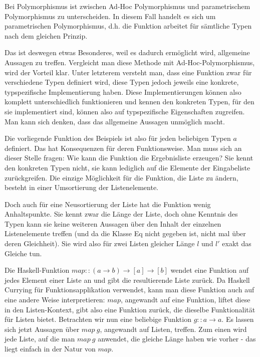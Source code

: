 Bei Polymorphismus ist zwischen Ad-Hoc Polymorphismus und parametrischem Poly\-mor\-phis\-mus zu unterscheiden. In diesem Fall handelt es sich um parametrischen Polymorphismus, d.h. die Funktion arbeitet für sämtliche Typen nach dem gleichen Prinzip.

Das ist deswegen etwas Besonderes, weil es dadurch ermöglicht wird, allgemeine Aussagen zu treffen. Vergleicht man diese
Methode mit Ad-Hoc-Polymorphismus, wird der Vorteil klar. Unter letzterem versteht man, dass eine Funktion zwar für verschiedene Typen definiert wird, diese Typen jedoch jeweils eine konkrete, typspezifische Implementierung haben. Diese
Implementierungen können also komplett unterschiedlich funktionieren und kennen den konkreten Typen, für den sie implementiert
sind, können also auf typspezifische Eigenschaften zugreifen. Man kann sich denken, dass das allgemeine Aussagen unmöglich
macht.

Die vorliegende Funktion des Beispiels ist also für jeden beliebigen Typen $a$ definiert. Das hat Konsequenzen für
deren Funktionsweise. Man muss sich an dieser Stelle fragen: Wie kann die Funktion die Ergebnisliste erzeugen? Sie kennt den konkreten Typen nicht, sie kann lediglich auf die Elemente der Eingabeliste zurückgreifen. Die einzige Möglichkeit für die Funktion,
die Liste zu ändern, besteht in einer Umsortierung der Listenelemente.

Doch auch für eine Neusortierung der Liste hat die Funktion wenig Anhaltspunkte. Sie kennt zwar die Länge der Liste, doch ohne Kenntnis des Typen kann sie keine weiteren Aussagen über den Inhalt der einzelnen Listenelemente treffen (und da die Klasse Eq nicht
gegeben ist, nicht mal über deren Gleichheit). Sie wird also für zwei Listen gleicher Länge $l$ und $l'$ exakt das Gleiche tun.

Die Haskell-Funktion \texttt{$map :: (a \rightarrow b) \rightarrow [a] \rightarrow [b]$} wendet eine Funktion auf jedes Element einer Liste an und gibt die resultierende Liste zurück. Da Haskell Currying für Funktionsapplikation verwendet, kann man
diese Funktion auch auf eine andere Weise interpretieren: $map$, angewandt auf eine Funktion, liftet diese in den Listen-Kontext,
gibt also eine Funktion zurück, die dieselbe Funktionalität für Listen bietet. Betrachten wir nun eine beliebige Funktion $g :: a \rightarrow a$. Es lassen sich jetzt Aussagen über $map\ g$, angewandt auf Listen, treffen. Zum einen wird jede Liste, auf die man $map\ g$ anwendet, die gleiche Länge haben wie vorher - das liegt einfach in der Natur von $map$.

